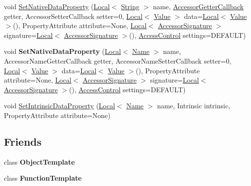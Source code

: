 \begin{DoxyCompactItemize}
\item 
void \hyperlink{classv8_1_1_template_ae23966bef9b32df6ced859a39b4a1f19}{Set\+Native\+Data\+Property} (\hyperlink{classv8_1_1_local}{Local}$<$ \hyperlink{classv8_1_1_string}{String} $>$ name, \hyperlink{namespacev8_a722613c87061708a4f1aa050d095f868}{Accessor\+Getter\+Callback} getter, Accessor\+Setter\+Callback setter=0, \hyperlink{classv8_1_1_local}{Local}$<$ \hyperlink{classv8_1_1_value}{Value} $>$ data=\hyperlink{classv8_1_1_local}{Local}$<$ \hyperlink{classv8_1_1_value}{Value} $>$(), Property\+Attribute attribute=None, \hyperlink{classv8_1_1_local}{Local}$<$ \hyperlink{classv8_1_1_accessor_signature}{Accessor\+Signature} $>$ signature=\hyperlink{classv8_1_1_local}{Local}$<$ \hyperlink{classv8_1_1_accessor_signature}{Accessor\+Signature} $>$(), \hyperlink{namespacev8_a31d8355cb043d7d2dda3f4a52760b64e}{Access\+Control} settings=D\+E\+F\+A\+U\+LT)
\item 
void {\bfseries Set\+Native\+Data\+Property} (\hyperlink{classv8_1_1_local}{Local}$<$ \hyperlink{classv8_1_1_name}{Name} $>$ name, Accessor\+Name\+Getter\+Callback getter, Accessor\+Name\+Setter\+Callback setter=0, \hyperlink{classv8_1_1_local}{Local}$<$ \hyperlink{classv8_1_1_value}{Value} $>$ data=\hyperlink{classv8_1_1_local}{Local}$<$ \hyperlink{classv8_1_1_value}{Value} $>$(), Property\+Attribute attribute=None, \hyperlink{classv8_1_1_local}{Local}$<$ \hyperlink{classv8_1_1_accessor_signature}{Accessor\+Signature} $>$ signature=\hyperlink{classv8_1_1_local}{Local}$<$ \hyperlink{classv8_1_1_accessor_signature}{Accessor\+Signature} $>$(), \hyperlink{namespacev8_a31d8355cb043d7d2dda3f4a52760b64e}{Access\+Control} settings=D\+E\+F\+A\+U\+LT)\hypertarget{classv8_1_1_template_a9aebe244ed9f88d7653bfbecb4e62026}{}\label{classv8_1_1_template_a9aebe244ed9f88d7653bfbecb4e62026}

\item 
void \hyperlink{classv8_1_1_template_aef172ef714818a210d815de389a5ab77}{Set\+Intrinsic\+Data\+Property} (\hyperlink{classv8_1_1_local}{Local}$<$ \hyperlink{classv8_1_1_name}{Name} $>$ name, Intrinsic intrinsic, Property\+Attribute attribute=None)
\end{DoxyCompactItemize}
\subsection*{Friends}
\begin{DoxyCompactItemize}
\item 
class {\bfseries Object\+Template}\hypertarget{classv8_1_1_template_a4d28646409234f556983be8a96c06424}{}\label{classv8_1_1_template_a4d28646409234f556983be8a96c06424}

\item 
class {\bfseries Function\+Template}\hypertarget{classv8_1_1_template_a334168ad1a5f39cf17b818ca3356aacd}{}\label{classv8_1_1_template_a334168ad1a5f39cf17b818ca3356aacd}

\end{DoxyCompactItemize}



